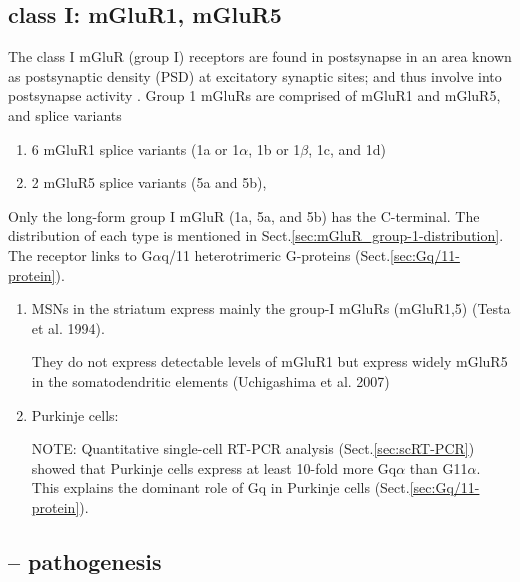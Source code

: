 \subsection{class I: mGluR1, mGluR5}
\label{sec:mGluR_group-1}

The class I mGluR (group I) receptors are found in postsynapse in an area known
as   postsynaptic density (PSD) at excitatory synaptic sites; and thus involve
into postsynapse activity \citep{lujan1996, mao2008}.  Group 1 mGluRs are
comprised of mGluR1 and mGluR5, and splice variants
\begin{enumerate}
  \item 6 mGluR1 splice variants (1a or 1$\alpha$, 1b or 1$\beta$, 1c, and 1d)
  
  \item 2 mGluR5 splice variants (5a and 5b),
\end{enumerate}
Only the long-form group I mGluR (1a, 5a, and 5b) has the C-terminal.
The distribution of each type is mentioned in
Sect.\ref{sec:mGluR_group-1-distribution}. The receptor links to G$\alpha$q/11
heterotrimeric G-proteins (Sect.\ref{sec:Gq/11-protein}).



\begin{enumerate}
  \item  MSNs in the striatum express mainly the group-I mGluRs (mGluR1,5)
  (Testa et al.   1994).

  They do not express detectable levels of mGluR1 but express widely mGluR5 in
  the somatodendritic elements (Uchigashima et al. 2007)

  \item Purkinje cells:
  
NOTE: Quantitative single-cell RT-PCR analysis (Sect.\ref{sec:scRT-PCR}) showed
that Purkinje cells express at least 10-fold more Gq$\alpha$ than G11$\alpha$.
This explains the dominant role of Gq in Purkinje cells
(Sect.\ref{sec:Gq/11-protein}).
  
\end{enumerate}


\subsection{-- pathogenesis}

